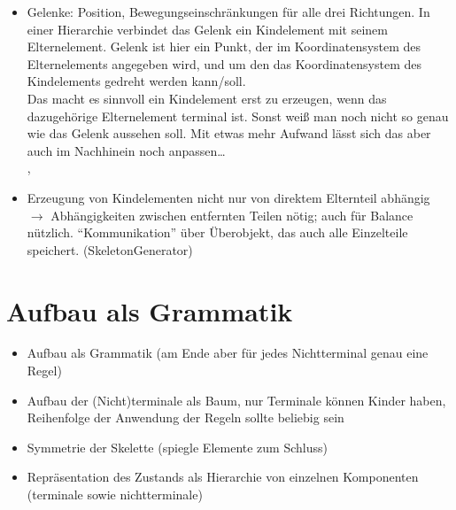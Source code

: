 \begin{itemize}
 \item Gelenke: Position, Bewegungseinschränkungen für alle drei Richtungen. In einer Hierarchie verbindet das Gelenk ein Kindelement mit seinem Elternelement. Gelenk ist hier ein Punkt, der im Koordinatensystem des Elternelements angegeben wird, und um den das Koordinatensystem des Kindelements gedreht werden kann/soll.\\
 Das macht es sinnvoll ein Kindelement erst zu erzeugen, wenn das dazugehörige Elternelement terminal ist. Sonst weiß man noch nicht so genau wie das Gelenk aussehen soll. Mit etwas mehr Aufwand lässt sich das aber auch im Nachhinein noch anpassen\dots\\
 , %
 
 \item Erzeugung von Kindelementen nicht nur von direktem Elternteil abhängig $\rightarrow$ Abhängigkeiten zwischen entfernten Teilen nötig; auch für Balance nützlich. "`Kommunikation"' über Überobjekt, das auch alle Einzelteile speichert. (SkeletonGenerator)
\end{itemize}


\section{Aufbau als Grammatik}

\begin{itemize}
  \item Aufbau als Grammatik (am Ende aber für jedes Nichtterminal genau eine Regel)
  \item Aufbau der (Nicht)terminale als Baum, nur Terminale können Kinder haben, Reihenfolge der Anwendung der Regeln sollte beliebig sein
  \item Symmetrie der Skelette (spiegle Elemente zum Schluss)
  \item Repräsentation des Zustands als Hierarchie von einzelnen Komponenten (terminale sowie nichtterminale)
 \end{itemize}
 
